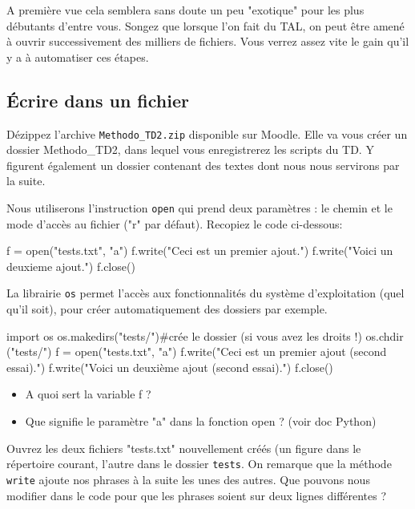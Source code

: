  A première vue cela semblera sans doute un peu "exotique" pour les plus débutants d'entre vous. Songez que lorsque l'on fait du TAL, on peut être amené à ouvrir successivement des milliers de fichiers. Vous verrez assez vite le gain qu'il y a à automatiser ces étapes.

\subsection{Écrire dans un fichier}

 Dézippez l'archive \texttt{Methodo\_TD2.zip} disponible sur Moodle. Elle va vous créer un dossier Methodo\_TD2, dans lequel vous enregistrerez les scripts du TD. Y figurent également un dossier contenant des textes dont nous nous servirons par la suite.

\exer

 Nous utiliserons l'instruction \texttt{open} qui prend deux paramètres : le chemin et le mode d'accès au fichier ("r" par défaut). Recopiez le code ci-dessous: %
\begin{python}
f = open("tests.txt", "a")
f.write("Ceci est un premier ajout.")
f.write("Voici un deuxieme ajout.")
f.close()
\end{python}

 La librairie \texttt{os} permet l'accès aux fonctionnalités du système d'exploitation (quel qu'il soit), pour créer automatiquement des dossiers par exemple.

\begin{python}
import os 
os.makedirs("tests/")#crée le dossier (si vous avez les droits !)
os.chdir ("tests/")
f = open("tests.txt", "a")
f.write("Ceci est un premier ajout (second essai).")
f.write("Voici un deuxième ajout (second essai).")
f.close()
\end{python}

\begin{itemize}
\item A quoi sert la variable f ?
\item Que signifie le paramètre "a" dans la fonction open ? (voir doc Python)
\end{itemize}

Ouvrez les deux fichiers "tests.txt" nouvellement créés (un figure dans le répertoire courant, l'autre dans le dossier \texttt{tests}.
 On remarque que la méthode \texttt{write} ajoute nos phrases à la suite les unes des autres. Que pouvons nous modifier dans le code pour que les phrases soient sur deux lignes différentes ?

